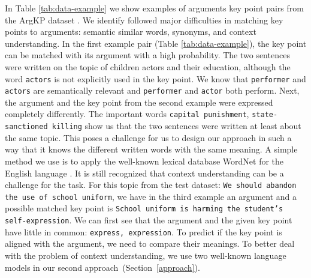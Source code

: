In Table \ref{tab:data-example} we show examples of arguments key point pairs from the ArgKP dataset \cite{Bar-HaimEFKLS2020}. 
We identify followed major difficulties in matching key points to arguments: semantic similar words, synonyms, and context understanding.
In the first example pair (Table \ref{tab:data-example}), the key point can be matched with its argument with a high probability. 
The two sentences were written on the topic of children actors and their education, although the word \texttt{actors} is not explicitly used in the key point. 
We know that \texttt{performer} and \texttt{actors} are semantically relevant and \texttt{performer} and \texttt{actor} both perform. Next, the argument and the key point from the second example were expressed completely differently. 
The important words \texttt{capital punishment}, \texttt{state-sanctioned killing} show us that the two sentences were written at least about the same topic. 
This poses a challenge for us to design our approach in such a way that it knows the different written words with the same meaning. 
A simple method we use is to apply the well-known lexical database WordNet for the English language \cite{Miller1995}.
It is still recognized that context understanding can be a challenge for the task. For this topic from the test dataset:
\texttt{We should abandon the use of school uniform}, we have in the third example an argument and a possible matched key point is \texttt{School uniform is harming the student's self-expression}. 
We can first see that the argument and the given key point have little in common: \texttt{express, expression}. 
To predict if the key point is aligned with the argument, we need to compare their meanings. 
To better deal with the problem of context understanding, we use two well-known language models in our second approach~(Section~\ref{approach}).

